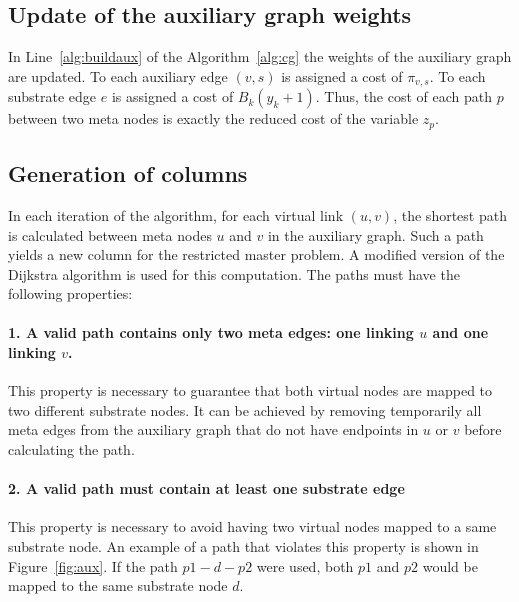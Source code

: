 \documentclass[article]{llncs}
\begin{document}
\subsection{Update of the auxiliary graph weights}\label{sec:update}
In Line~\ref{alg:buildaux} of the Algorithm~\ref{alg:cg} the weights of the auxiliary graph are updated.
To each auxiliary edge $(v,s)$ is assigned a cost of $\pi_{v,s}$. 
To each substrate edge $e$ is assigned a cost of $B_{k}(y_{k} + 1)$. 
Thus, the cost of each path $p$ between two meta nodes is exactly the reduced cost of the variable $z_{p}$.


\subsection{Generation of columns}
In each iteration of the algorithm, for each virtual link $(u,v)$, the shortest path is calculated between meta nodes $u$ and $v$ in the auxiliary graph.
Such a path yields a new column for the restricted master problem. 
A modified version of the Dijkstra algorithm is used for this computation. 
The paths must have the following properties:

\paragraph{1. A valid path contains only two meta edges: one linking $u$ and one linking $v$.}
This property is necessary to guarantee that both virtual nodes are mapped to two different substrate nodes. 
It can be achieved by removing temporarily all meta edges from the auxiliary graph that do not have endpoints in $u$ or $v$ before calculating the path. 

\paragraph{2. A valid path must contain at least one substrate edge}
This property is necessary to avoid having two virtual nodes mapped to a same substrate node.
An example of a path that violates this property is shown in Figure~\ref{fig:aux}. 
If the path $p1-d-p2$ were used, both $p1$ and $p2$ would be mapped to the same substrate node $d$. 
\end{document}
